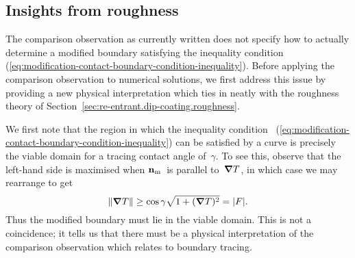 \subsection{Insights from roughness}
\label{sec:small.modification.insights}

The comparison observation as currently written
does not specify how to actually determine a modified boundary
satisfying the inequality condition~%
  (\ref{eq:modification-contact-boundary-condition-inequality}).
Before applying the comparison observation to numerical solutions,
we first address this issue
by providing a new physical interpretation
which ties in neatly with the roughness theory
of Section~\ref{sec:re-entrant.dip-coating.roughness}.

We first note that the region in which the inequality condition~%
  (\ref{eq:modification-contact-boundary-condition-inequality})
can be satisfied by a curve
is precisely the viable domain for a tracing contact angle of~$\gamma$.
To see this, observe that the left-hand side is maximised
when $\mathop{}\!\boldsymbol{\mathbf{n}}_{\mathrm{m}}$~is parallel to~$\mathop{}\!\boldsymbol{\mathbf{\nabla}} T$,
in which case we may rearrange to get
\[
  \lVert\mathop{}\!\boldsymbol{\mathbf{\nabla}} T\rVert \ge \cos\gamma \sqrt{1 + (\mathop{}\!\boldsymbol{\mathbf{\nabla}} T)^2} = \lvert F\rvert.
\]
Thus the modified boundary must lie in the viable domain.
This is not a coincidence;
it tells us that there must be
a physical interpretation of the comparison observation
which relates to boundary tracing.

